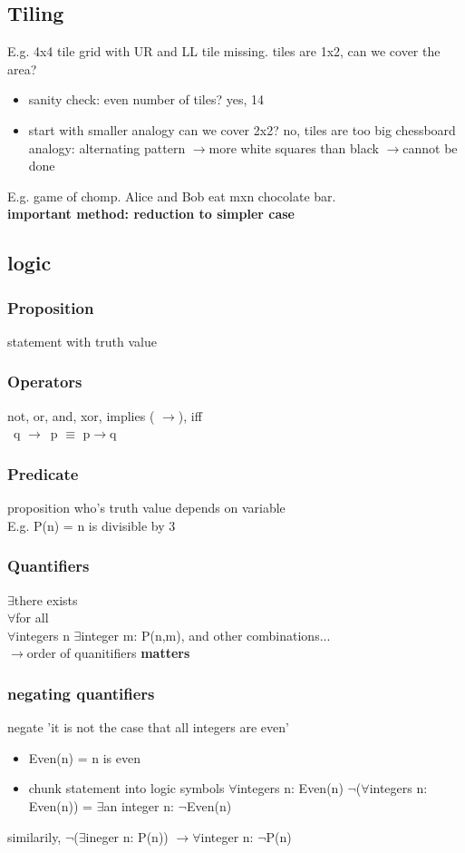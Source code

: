 \documentclass[a4paper]{article}
\newcommand{\ra}{$\rightarrow$}
\newcommand{\fa}{$\forall$}
\newcommand{\te}{$\exists$}
\newcommand{\n}{$\neg$}
\begin{document}
    \subsection{Tiling}
      E.g. 4x4 tile grid with UR and LL tile missing. tiles are 1x2, can we cover the area?\\
      \begin{itemize}
        \item sanity check: even number of tiles?
          \subitem yes, 14
        \item start with smaller analogy
          \subitem can we cover 2x2?
          \subitem no, tiles are too big
          \subitem chessboard analogy: alternating pattern \ra more white squares than black
          \subitem \ra cannot be done
      \end{itemize}
      E.g. game of chomp. Alice and Bob eat mxn chocolate bar. \\
      \textbf{important method: reduction to simpler case}
    \subsection{logic}
      \subsubsection{Proposition}
        statement with truth value
      \subsubsection{Operators}
        not, or, and, xor, implies ( \ra ), iff\\
        ~q \ra ~p $\equiv$ p\ra q
      \subsubsection{Predicate}
        proposition who's truth value depends on variable\\
        E.g. P(n) = n is divisible by 3
      \subsubsection{Quantifiers}
        \te there exists\\
        \fa for all\\
        \fa integers n \te integer m: P(n,m), and other combinations...\\
        \ra order of quanitifiers \textbf{matters}
      \subsubsection{negating quantifiers}
        negate 'it is not the case that all integers are even'
        \begin{itemize}
          \item Even(n) = n is even
          \item chunk statement into logic symbols
            \subsubitem \fa integers n: Even(n)
            \subsubitem \n (\fa integers n: Even(n)) = \te an integer n: \n Even(n)
        \end{itemize}
        similarily, \n (\te ineger n: P(n)) \ra \fa integer n: \n P(n)\\
\end{document}

